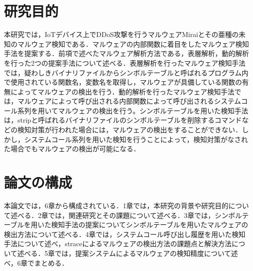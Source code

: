 \section{研究目的}
本研究では，IoTデバイス上でDDoS攻撃を行うマルウェアMiraiとその亜種の未知のマルウェア検知である．マルウェアの内部関数に着目をしたマルウェア検知手法を提案する．前項で述べたマルウェア解析方法である，表層解析，動的解析を行った2つの提案手法について述べる．表層解析を行ったマルウェア検知手法では，疑わしきバイナリファイルからシンボルテーブルと呼ばれるプログラム内で使用されている関数名，変数名を取得し，マルウェアが具備している関数の有無によってマルウェアの検出を行う．動的解析を行ったマルウェア検知手法では，マルウェアによって呼び出される内部関数によって呼び出されるシステムコール系列を用いてマルウェアの検出を行う。シンボルテーブルを用いた検知手法は，stripと呼ばれるバイナリファイルのシンボルテーブルを削除するコマンドなどの検知対策が行われた場合には，マルウェアの検出をすることができない．しかし，システムコール系列を用いた検知を行うことによって，検知対策がなされた場合でもマルウェアの検出が可能になる．
　
\section{論文の構成}
本論文では，6章から構成されている．1章では，本研究の背景や研究目的について述べる．2章では，関連研究とその課題について述べる．3章では，シンボルテーブルを用いた検知手法の提案についてシンボルテーブルを用いたマルウェアの検出方法について述べる．4章では，システムコール呼び出し履歴を用いた検知手法について述べ，straceによるマルウェアの検出方法の課題点と解決方法について述べる．5章では，提案システムによるマルウェアの検知精度について述べ，6章でまとめる．%

